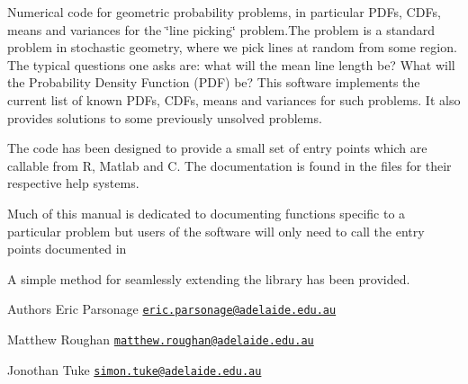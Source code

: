 Numerical code for geometric probability problems, in particular P\-D\-Fs, C\-D\-Fs, means and variances for the \char`\"{}line picking\char`\"{} problem.\-The problem is a standard problem in stochastic geometry, where we pick lines at random from some region. The typical questions one asks are\-: what will the mean line length be? What will the Probability Density Function (P\-D\-F) be? This software implements the current list of known P\-D\-Fs, C\-D\-Fs, means and variances for such problems. It also provides solutions to some previously unsolved problems.

The code has been designed to provide a small set of entry points which are callable from R, Matlab and C. The documentation is found in the files for their respective help systems.

Much of this manual is dedicated to documenting functions specific to a particular problem but users of the software will only need to call the entry points documented in

A simple method for seamlessly extending the library has been provided.

\begin{DoxyAuthor}{Authors}
Eric Parsonage \href{mailto:eric.parsonage@adelaide.edu.au}{\tt eric.\-parsonage@adelaide.\-edu.\-au} 

Matthew Roughan \href{mailto:matthew.roughan@adelaide.edu.au}{\tt matthew.\-roughan@adelaide.\-edu.\-au} 

Jonothan Tuke \href{mailto:simon.tuke@adelaide.edu.au}{\tt simon.\-tuke@adelaide.\-edu.\-au} 
\end{DoxyAuthor}
